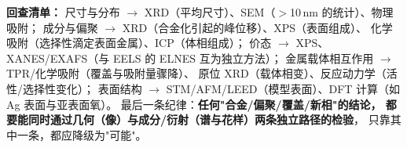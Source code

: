 \begin{crosscheck}
\textbf{回查清单：}
尺寸与分布 $\rightarrow$ XRD（平均尺寸）、SEM（$>$10\,nm 的统计）、物理吸附；
成分与偏聚 $\rightarrow$ XRD（合金化引起的峰位移）、XPS（表面组成）、
化学吸附（选择性滴定表面金属）、ICP（体相组成）；
价态 $\rightarrow$ XPS、XANES/EXAFS（与 EELS 的 ELNES 互为独立方法）；
金属载体相互作用 $\rightarrow$ TPR/化学吸附（覆盖与吸附量骤降）、
原位 XRD（载体相变）、反应动力学（活性/选择性变化）；
表面结构 $\rightarrow$ STM/AFM/LEED（模型表面）、DFT 计算（如 Ag 表面与亚表面氧）。
最后一条纪律：\textbf{任何"合金/偏聚/覆盖/新相"的结论，
都要能同时通过几何（像）与成分/衍射（谱与花样）两条独立路径的检验}，
只靠其中一条，都应降级为"可能"。
\end{crosscheck}




